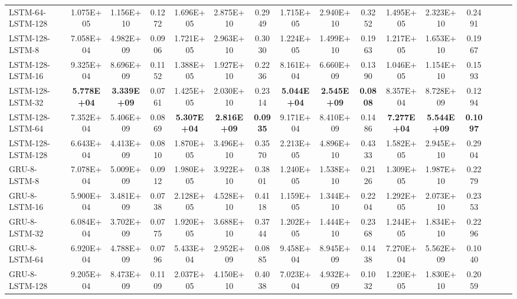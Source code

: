 \begin{landscape}
\begin{longtable}{|l|c|c|c|c|c|c|c|c|c|c|c|c|c|c|c|}
    LSTM-64-LSTM-128 & 1.075E+05 & 1.156E+10 & 0.1272 & 1.696E+05 & 2.875E+10 & 0.2949 & 1.715E+05 & 2.940E+10 & 0.3252 & 1.495E+05 & 2.323E+10 & 0.2491 \\
    LSTM-128-LSTM-8 & 7.058E+04 & 4.982E+09 & 0.0906 & 1.721E+05 & 2.963E+10 & 0.3030 & 1.224E+05 & 1.499E+10 & 0.1963 & 1.217E+05 & 1.653E+10 & 0.1967 \\
    LSTM-128-LSTM-16 & 9.325E+04 & 8.696E+09 & 0.1152 & 1.388E+05 & 1.927E+10 & 0.2236 & 8.161E+04 & 6.660E+09 & 0.1390 & 1.046E+05 & 1.154E+10 & 0.1593 \\
    LSTM-128-LSTM-32 & \cellcolor[rgb]{ .573,  .816,  .314}\textbf{5.778E+04} & \cellcolor[rgb]{ .573,  .816,  .314}\textbf{3.339E+09} & 0.0761 & 1.425E+05 & 2.030E+10 & 0.2314 & \cellcolor[rgb]{ .573,  .816,  .314}\textbf{5.044E+04} & \cellcolor[rgb]{ .573,  .816,  .314}\textbf{2.545E+09} & \cellcolor[rgb]{ .573,  .816,  .314}\textbf{0.0808} & 8.357E+04 & 8.728E+09 & 0.1294 \\
    LSTM-128-LSTM-64 & 7.352E+04 & 5.406E+09 & 0.0869 & \cellcolor[rgb]{ .573,  .816,  .314}\textbf{5.307E+04} & \cellcolor[rgb]{ .573,  .816,  .314}\textbf{2.816E+09} & \cellcolor[rgb]{ .573,  .816,  .314}\textbf{0.0935} & 9.171E+04 & 8.410E+09 & 0.1486 & \cellcolor[rgb]{ .573,  .816,  .314}\textbf{7.277E+04} & \cellcolor[rgb]{ .573,  .816,  .314}\textbf{5.544E+09} & \cellcolor[rgb]{ .573,  .816,  .314}\textbf{0.1097} \\
    LSTM-128-LSTM-128 & 6.643E+04 & 4.413E+09 & 0.0810 & 1.870E+05 & 3.496E+10 & 0.3570 & 2.213E+05 & 4.896E+10 & 0.4333 & 1.582E+05 & 2.945E+10 & 0.2904 \\
    \midrule
    GRU-8-LSTM-8 & 7.078E+04 & 5.009E+09 & 0.0912 & 1.980E+05 & 3.922E+10 & 0.3801 & 1.240E+05 & 1.538E+10 & 0.2126 & 1.309E+05 & 1.987E+10 & 0.2279 \\
    GRU-8-LSTM-16 & 5.900E+04 & 3.481E+09 & 0.0738 & 2.128E+05 & 4.528E+10 & 0.4118 & 1.159E+05 & 1.344E+10 & 0.2204 & 1.292E+05 & 2.073E+10 & 0.2353 \\
    GRU-8-LSTM-32 & 6.084E+04 & 3.702E+09 & 0.0775 & 1.920E+05 & 3.688E+10 & 0.3744 & 1.202E+05 & 1.444E+10 & 0.2368 & 1.244E+05 & 1.834E+10 & 0.2296 \\
    GRU-8-LSTM-64 & 6.920E+04 & 4.788E+09 & 0.0796 & 5.433E+04 & 2.952E+09 & 0.0885 & 9.458E+04 & 8.945E+09 & 0.1438 & 7.270E+04 & 5.562E+09 & 0.1040 \\
    GRU-8-LSTM-128 & 9.205E+04 & 8.473E+09 & 0.1109 & 2.037E+05 & 4.150E+10 & 0.4038 & 7.023E+04 & 4.932E+09 & 0.1032 & 1.220E+05 & 1.830E+10 & 0.2059 \\

\end{longtable}
\end{landscape}
